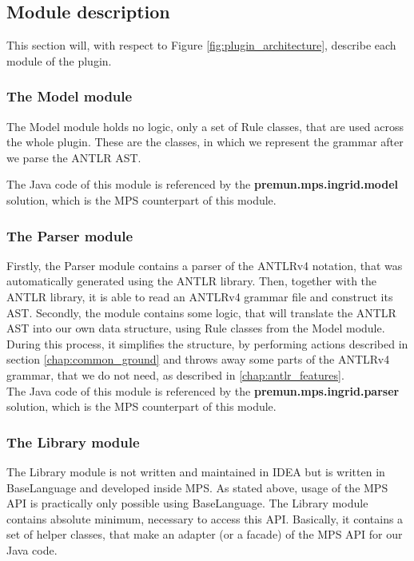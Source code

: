 \subsection{Module description}

This section will, with respect to Figure \ref{fig:plugin_architecture}, describe each module of the plugin.

\subsubsection{The Model module}

The Model module holds no logic, only a set of Rule classes, that are used across the whole plugin.
These are the classes, in which we represent the grammar after we parse the ANTLR AST.

The Java code of this module is referenced by the \textbf{premun.mps.ingrid.model} solution, which is the MPS counterpart of this module.

\subsubsection{The Parser module}

Firstly, the Parser module contains a parser of the ANTLRv4 notation, that was automatically generated using the ANTLR library.
Then, together with the ANTLR library, it is able to read an ANTLRv4 grammar file and construct its AST.
Secondly, the module contains some logic, that will translate the ANTLR AST into our own data structure, using Rule classes from the Model module.
During this process, it simplifies the structure, by performing actions described in section \ref{chap:common_ground} and throws away some parts of the ANTLRv4 grammar, that we do not need, as described in \ref{chap:antlr_features}.
\\

The Java code of this module is referenced by the \textbf{premun.mps.ingrid.parser} solution, which is the MPS counterpart of this module.

\subsubsection{The Library module}

The Library module is not written and maintained in IDEA but is written in BaseLanguage and developed inside MPS.
As stated above, usage of the MPS API is practically only possible using BaseLanguage.
The Library module contains absolute minimum, necessary to access this API.
Basically, it contains a set of helper classes, that make an adapter (or a facade) of the MPS API for our Java code.
\\

